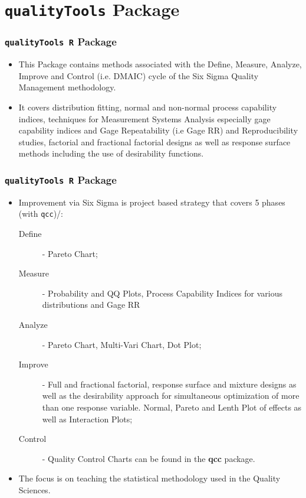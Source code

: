 \documentclass{beamer}
\begin{document}
\section{\texttt{qualityTools} Package}
\begin{frame}

\frametitle{\texttt{qualityTools R} Package}
\begin{itemize}
\item This Package contains methods associated with the Define, Measure, Analyze, Improve and Control (i.e. DMAIC) cycle of the Six Sigma Quality Management methodology.
\item It covers distribution fitting, normal and non-normal process capability indices, techniques for Measurement Systems Analysis especially gage capability indices and Gage Repeatability (i.e Gage RR) and Reproducibility studies, factorial and fractional factorial designs as well as response surface methods including the use of desirability functions. 
\end{itemize}
\end{frame}


\begin{frame}
\frametitle{\texttt{qualityTools R} Package}

\begin{itemize}
\item Improvement via Six Sigma is project based strategy that covers 5 phases (with \texttt{qcc})/: 
\begin{description}
\item[Define] - Pareto Chart; 
\item[Measure] - Probability and QQ Plots, Process Capability Indices for various distributions and Gage RR 
\item[Analyze] - Pareto Chart, Multi-Vari Chart, Dot Plot; 
\item[Improve] - Full and fractional factorial, response surface and mixture designs as well as the desirability approach for simultaneous optimization of more than one response variable. Normal, Pareto and Lenth Plot of effects as well as Interaction Plots; 
\item[Control] - Quality Control Charts can be found in the \textbf{qcc} package. 
\end{description}

\item The focus is on teaching the statistical methodology used in the Quality Sciences.
\end{itemize}
\end{frame}

\end{document}
